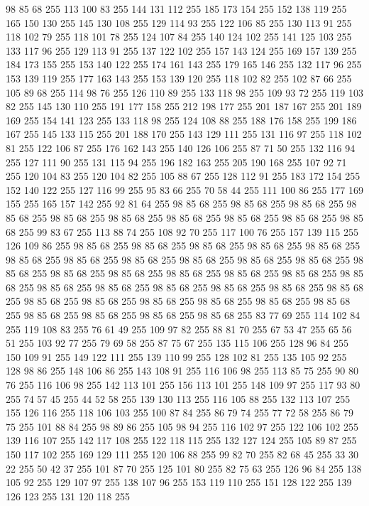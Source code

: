 98 85 68 255 113 100 83 255 144 131 112 255 185 173 154 255 152 138 119 255 165 150 130 255 145 130 108 255 129 114 93 255 122 106 85 255 130 113 91 255 118 102 79 255 118 101 78 255 124 107 84 255 140 124 102 255 141 125 103 255 133 117 96 255 129 113 91 255 137 122 102 255 157 143 124 255 169 157 139 255 184 173 155 255 153 140 122 255 174 161 143 255 179 165 146 255 132 117 96 255 153 139 119 255 177 163 143 255 153 139 120 255 118 102 82 255 102 87 66 255 105 89 68 255 114 98 76 255 126 110 89 255 133 118 98 255 109 93 72 255 119 103 82 255 145 130 110 255 191 177 158 255 212 198 177 255 201 187 167 255 201 189 169 255 154 141 123 255 133 118 98 255 124 108 88 255 188 176 158 255 199 186 167 255 145 133 115 255 201 188 170 255 143 129 111 255 131 116 97 255 118 102 81 255 122 106 87 255 176 162 143 255 140 126 106 255 87 71 50 255 132 116 94 255 127 111 90 255 131 115 94 255 196 182 163 255 205 190 168 255 107 92 71 255 120 104 83 255 120 104 82 255 105 88 67 255
128 112 91 255 183 172 154 255 152 140 122 255 127 116 99 255 95 83 66 255 70 58 44 255 111 100 86 255 177 169 155 255 165 157 142 255 92 81 64 255 98 85 68 255 98 85 68 255 98 85 68 255 98 85 68 255 98 85 68 255 98 85 68 255 98 85 68 255 98 85 68 255 98 85 68 255 98 85 68 255 99 83 67 255 113 88 74 255 108 92 70 255 117 100 76 255 157 139 115 255 126 109 86 255 98 85 68 255 98 85 68 255 98 85 68 255 98 85 68 255 98 85 68 255 98 85 68 255 98 85 68 255 98 85 68 255 98 85 68 255 98 85 68 255 98 85 68 255 98 85 68 255 98 85 68 255 98 85 68 255 98 85 68 255 98 85 68 255 98 85 68 255 98 85 68 255 98 85 68 255 98 85 68 255 98 85 68 255 98 85 68 255 98 85 68 255 98 85 68 255 98 85 68 255 98 85 68 255 98 85 68 255 98 85 68 255 98 85 68 255 98 85 68 255 98 85 68 255 98 85 68 255 98 85 68 255 98 85 68 255 83 77 69 255 114 102 84 255 119 108 83 255 76 61 49 255
109 97 82 255 88 81 70 255 67 53 47 255 65 56 51 255 103 92 77 255 79 69 58 255 87 75 67 255 135 115 106 255 128 96 84 255 150 109 91 255 149 122 111 255 139 110 99 255 128 102 81 255 135 105 92 255 128 98 86 255 148 106 86 255 143 108 91 255 116 106 98 255 113 85 75 255 90 80 76 255 116 106 98 255 142 113 101 255 156 113 101 255 148 109 97 255 117 93 80 255 74 57 45 255 44 52 58 255 139 130 113 255 116 105 88 255 132 113 107 255 155 126 116 255 118 106 103 255 100 87 84 255 86 79 74 255 77 72 58 255 86 79 75 255 101 88 84 255 98 89 86 255 105 98 94 255 116 102 97 255 122 106 102 255 139 116 107 255 142 117 108 255 122 118 115 255 132 127 124 255 105 89 87 255 150 117 102 255 169 129 111 255 120 106 88 255 99 82 70 255 82 68 45 255 33 30 22 255 50 42 37 255 101 87 70 255 125 101 80 255 82 75 63 255 126 96 84 255 138 105 92 255 129 107 97 255 138 107 96 255 153 119 110 255 151 128 122 255 139 126 123 255 131 120 118 255

